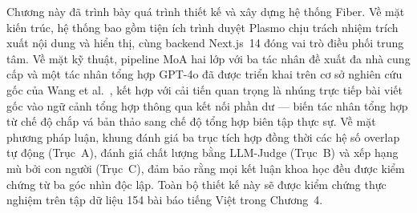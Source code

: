 Chương này đã trình bày quá trình thiết kế và xây dựng hệ thống Fiber. Về mặt kiến trúc, hệ thống bao gồm tiện ích trình duyệt Plasmo chịu trách nhiệm trích xuất nội dung và hiển thị, cùng backend Next.js~14 đóng vai trò điều phối trung tâm. Về mặt kỹ thuật, pipeline MoA hai lớp với ba tác nhân đề xuất đa nhà cung cấp và một tác nhân tổng hợp GPT-4o đã được triển khai trên cơ sở nghiên cứu gốc của Wang et al.\ \cite{Wang2024}, kết hợp với cải tiến quan trọng là nhúng trực tiếp bài viết gốc vào ngữ cảnh tổng hợp thông qua kết nối phần dư --- biến tác nhân tổng hợp từ chế độ chắp vá bản thảo sang chế độ tổng hợp biên tập thực sự. Về mặt phương pháp luận, khung đánh giá ba trục tích hợp đồng thời các hệ số overlap tự động (Trục~A), đánh giá chất lượng bằng LLM-Judge (Trục~B) và xếp hạng mù bởi con người (Trục~C), đảm bảo rằng mọi kết luận khoa học đều được kiểm chứng từ ba góc nhìn độc lập. Toàn bộ thiết kế này sẽ được kiểm chứng thực nghiệm trên tập dữ liệu 154 bài báo tiếng Việt trong Chương~4.
